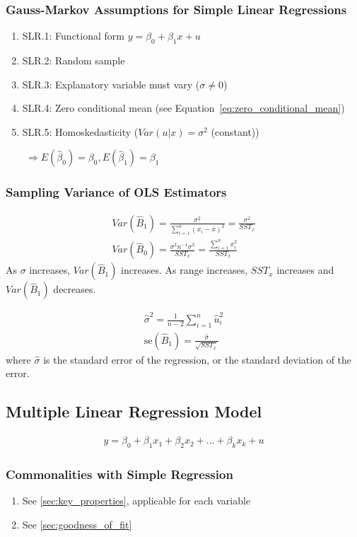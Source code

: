 \documentclass[12pt]{article}
\numberwithin{equation}{section}
\begin{document}
\subsubsection{Gauss-Markov Assumptions for Simple Linear Regressions}
\begin{enumerate}
    \item SLR.1: Functional form $y = \beta_0 + \beta_1 x + u$
    \item SLR.2: Random sample
    \item SLR.3: Explanatory variable must vary ($\sigma \neq 0$)
    \item SLR.4: Zero conditional mean (see Equation~\ref{eq:zero_conditional_mean})
    \item SLR.5: Homoskedasticity ($Var(u|x) = \sigma^2$ (constant))
\end{enumerate}
$\qquad \Rightarrow E(\hat{\beta}_0) = \beta_0, E(\hat{\beta}_1) = \beta_1$

\subsubsection{Sampling Variance of OLS Estimators}
\begin{gather}
    Var(\hat{B}_1) = \frac{\sigma^2}{\sum_{i=1}^{n} (x_i - \bar{x})^2} = \frac{\sigma^2}{SST_x} \\
    Var(\hat{B}_0) = \frac{\sigma^2 n^{-1} \sigma^2}{SST_x} = \frac{\sum_{i=1}^{n} {x_i^2}}{SST_x}
\end{gather}
As $\sigma$ increases, $Var(\hat{B}_1)$ increases. As range increases, $SST_x$ increases and $Var(\hat{B}_1)$ decreases.

\begin{gather}
    \hat{\sigma}^2 = \frac{1}{n-2} \sum_{i=1}^{n} \hat{u}_i^2 \\
    \text{se}(\hat{B}_1) = \frac{\hat{\sigma}}{\sqrt{SST_x}}
\end{gather}
where $\hat{\sigma}$ is the standard error of the regression, or the standard deviation of the error.

\subsection{Multiple Linear Regression Model}
\begin{gather}
    y = \beta_0 + \beta_1 x_1 + \beta_2 x_2 + ... + \beta_k x_k + u
\end{gather}

\subsubsection{Commonalities with Simple Regression}
\begin{enumerate}
    \item See \ref{sec:key_properties}, applicable for each variable
    \item See \ref{sec:goodness_of_fit}
\end{enumerate}
\end{document}

